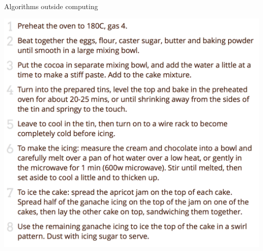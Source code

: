 \begin{frame}{Algorithms outside computing}
	\begin{center}
		\includegraphics[height=0.8\textheight]{cake_recipe}
	\end{center}
\end{frame}

